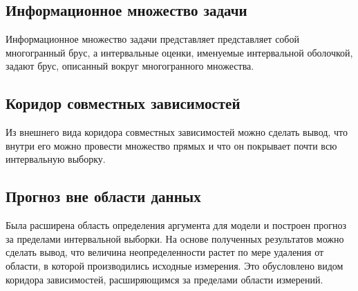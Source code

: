 \subsection{Информационное множество задачи} 

Информационное множество задачи представляет представляет собой многогранный брус, а интервальные оценки, именуемые интервальной оболочкой, задают брус, описанный вокруг многогранного множества.

\subsection{Коридор совместных зависимостей}

Из внешнего вида коридора совместных зависимостей можно сделать вывод, что внутри его можно провести множество прямых и что он покрывает почти всю интервальную выборку. 

\subsection{Прогноз вне области данных}

Была расширена область определения аргумента для модели и построен прогноз за пределами интервальной выборки. На основе полученных результатов можно сделать вывод, что величина неопределенности растет по мере удаления от области, в которой производились исходные измерения. Это обусловлено видом коридора зависимостей, расширяющимся за пределами области измерений.


\newpage
